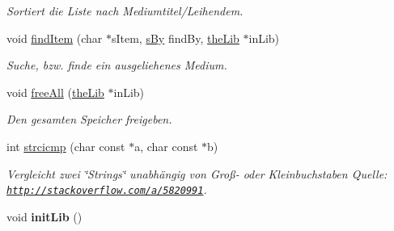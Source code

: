 \begin{DoxyCompactItemize}
\begin{DoxyCompactList}\small\item\em Sortiert die Liste nach Mediumtitel/\+Leihendem. \end{DoxyCompactList}\item 
void \hyperlink{group___lend_lib_item_gae1665c25a61e37797a9f1b35f9bd88be}{find\+Item} (char $\ast$s\+Item, \hyperlink{group___lend_lib_item_ga557119015745f6890b5eb4367beba8f3}{s\+By} find\+By, \hyperlink{structthe_lib}{the\+Lib} $\ast$in\+Lib)
\begin{DoxyCompactList}\small\item\em Suche, bzw. finde ein ausgeliehenes Medium. \end{DoxyCompactList}\item 
void \hyperlink{group___lend_lib_item_gaa843ad9e6dd8e4672639ffcdce77fe11}{free\+All} (\hyperlink{structthe_lib}{the\+Lib} $\ast$in\+Lib)
\begin{DoxyCompactList}\small\item\em Den gesamten Speicher freigeben. \end{DoxyCompactList}\item 
int \hyperlink{group___lend_lib_item_gae2842cb0cbdf6aa210eba0b735e63312}{strcicmp} (char const $\ast$a, char const $\ast$b)\hypertarget{group___lend_lib_item_gae2842cb0cbdf6aa210eba0b735e63312}{}\label{group___lend_lib_item_gae2842cb0cbdf6aa210eba0b735e63312}

\begin{DoxyCompactList}\small\item\em Vergleicht zwei \char`\"{}\+Strings\char`\"{} unabhängig von Groß-\/ oder Kleinbuchstaben Quelle\+: \href{http://stackoverflow.com/a/5820991}{\tt http\+://stackoverflow.\+com/a/5820991}. \end{DoxyCompactList}\item 
void {\bfseries init\+Lib} ()\hypertarget{group___lend_lib_item_ga08622759e4e71707d14ed931f1077b53}{}\label{group___lend_lib_item_ga08622759e4e71707d14ed931f1077b53}

\end{DoxyCompactItemize}

